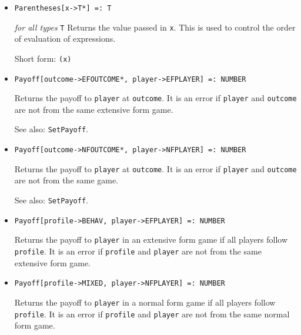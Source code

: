 \begin{itemize}
\item{}
\protect \large \begin{verbatim}
Parentheses[x->T*] =: T 
\end{verbatim}\normalsize

{\it for all types} {\tt T}
\bd
Returns the value passed in \verb+x+.  This is used to control
the order of evaluation of expressions.
\item [Short form:] \verb+(x)+
\ed

\item{}
\protect \large \begin{verbatim}
Payoff[outcome->EFOUTCOME*, player->EFPLAYER] =: NUMBER 
\end{verbatim}\normalsize
\bd
Returns the payoff to \verb+player+ at \verb+outcome+.  It is an error if
\verb+player+ and \verb+outcome+ are not from the same extensive form game.
\item [See also:] \verb+SetPayoff+.
\ed

\item{}
\protect \large \begin{verbatim}
Payoff[outcome->NFOUTCOME*, player->NFPLAYER] =: NUMBER 
\end{verbatim}\normalsize

\bd
Returns the payoff to \verb+player+ at \verb+outcome+.  It is an error if
\verb+player+ and \verb+outcome+ are not from the same game.
\item [See also:] \verb+SetPayoff+.
\ed

\item{}
\protect \large \begin{verbatim}
Payoff[profile->BEHAV, player->EFPLAYER] =: NUMBER 
\end{verbatim}\normalsize

\bd
Returns the payoff to \verb+player+ in an extensive form game if all
players follow \verb+profile+.  It is an error if \verb+profile+
and \verb+player+ are not from the same extensive form game.
\ed

\item{}
\protect \large \begin{verbatim}
Payoff[profile->MIXED, player->NFPLAYER] =: NUMBER 
\end{verbatim}\normalsize

\bd
Returns the payoff to \verb+player+ in a normal form game if all players
follow \verb+profile+.  It is an error if \verb+profile+ and \verb+player+
are not from the same normal form game.
\ed


\end{itemize}
